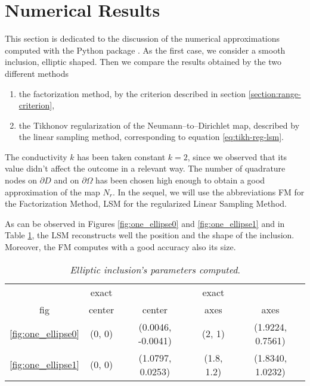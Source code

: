 \documentclass[10pt, a4paper, twoside, openright]{book}
\theoremstyle{definition}
\theoremstyle{plain}
\theoremstyle{plain}
\theoremstyle{plain}
\theoremstyle{plain}
\theoremstyle{plain}
\theoremstyle{plain}
\theoremstyle{plain}
\theoremstyle{plain}
\begin{document}
\section{Numerical Results}
This section is dedicated to the discussion of the numerical approximations computed with the 
Python package \cite{}.
As the first case, we consider a smooth inclusion, elliptic shaped. Then we compare the results obtained by 
the two different methods
\begin{enumerate}
 \item the factorization method, by the criterion described in section \ref{section:range-criterion},
 \item the Tikhonov regularization of the Neumann--to--Dirichlet map, described by the linear
 sampling method, corresponding to equation \eqref{eq:tikh-reg-lsm}.
\end{enumerate}
The conductivity $k$ has been taken constant $k=2$, since we observed that its value didn't 
affect the outcome in a relevant way. The number of quadrature nodes 
on $\partial D$ and on $\partial \Omega$ has been chosen high enough to obtain a good approximation 
of the map $N_r$.
In the sequel, we will use the abbreviations FM for the Factorization Method, LSM for the regularized 
Linear Sampling Method.
\par
As can be observed in Figures \ref{fig:one_ellipse0} and \ref{fig:one_ellipse1} and 
in Table \ref{tab:ellipse-parameters}, the LSM reconstructs well the position and the shape 
of the inclusion. Moreover, the FM computes with a good accuracy also its size. 

\begin{table}
\caption{\emph{Elliptic inclusion's parameters computed}.}
\label{tab:ellipse-parameters}
\begin{center}
\vspace*{-0.5cm}
\begin{tabular}{ccccc}
\toprule
 & exact && exact &\\
 fig & center & center & axes  & axes \\
\midrule
\ref{fig:one_ellipse0} & (0, 0) &  (0.0046, -0.0041) & (2, 1) & (1.9224, 0.7561) \\
\ref{fig:one_ellipse1} & (0, 0) &  (1.0797, 0.0253) & (1.8, 1.2) & (1.8340, 1.0232) \\
\bottomrule
\end{tabular}
\end{center}
\end{table}
\end{document}
